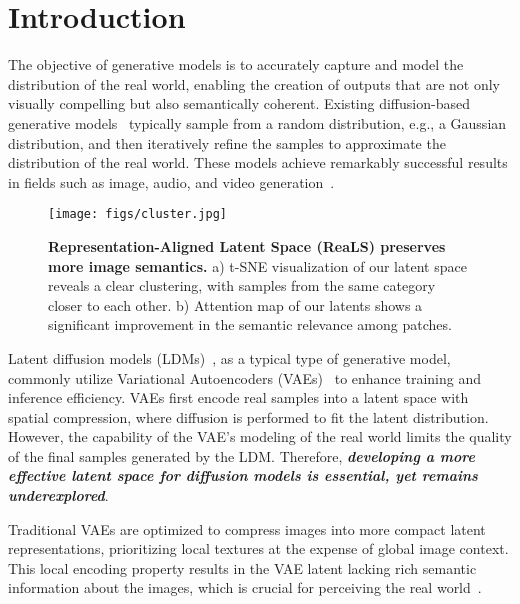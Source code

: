\section{Introduction}

The objective of generative models is to accurately capture and model the distribution of the real world, enabling the creation of outputs that are not only visually compelling but also semantically coherent. Existing diffusion-based generative models~\cite{dit, chang2022maskgit, rombach2022ldm} typically sample from a random distribution, e.g., a Gaussian distribution, and then iteratively refine the samples to approximate the distribution of the real world. These models achieve remarkably successful results in fields such as image, audio, and video generation~\cite{bar2023multidiffusion, huang2023make, ho2022video}.


\begin{figure}[t]
    \centering
    \texttt{[image: figs/cluster.jpg]}
    \vspace{-0.6cm}
    \caption{\textbf{Representation-Aligned Latent Space (ReaLS) preserves more image semantics.} a) t-SNE visualization of our latent space reveals a clear clustering, with samples from the same category closer to each other. b) Attention map of our latents shows a significant improvement in the semantic relevance among patches.}
    \label{fig:cluster}
    \vspace{-0.7cm}
\end{figure}


Latent diffusion models (LDMs)~\cite{rombach2022ldm}, as a typical type of generative model, commonly utilize Variational Autoencoders (VAEs)~\cite{doersch2016tutorial} to enhance training and inference efficiency. VAEs first encode real samples into a latent space with spatial compression, where diffusion is performed to fit the latent distribution. However, the capability of the VAE's modeling of the real world limits the quality of the final samples generated by the LDM. Therefore, \textbf{\textit{developing a more effective latent space for diffusion models is essential, yet remains underexplored}}.

Traditional VAEs are optimized to compress images into more compact latent representations, prioritizing local textures at the expense of global image context. This local encoding property results in the VAE latent lacking rich semantic information about the images, which is crucial for perceiving the real world~\cite{yu2024representation}. 

